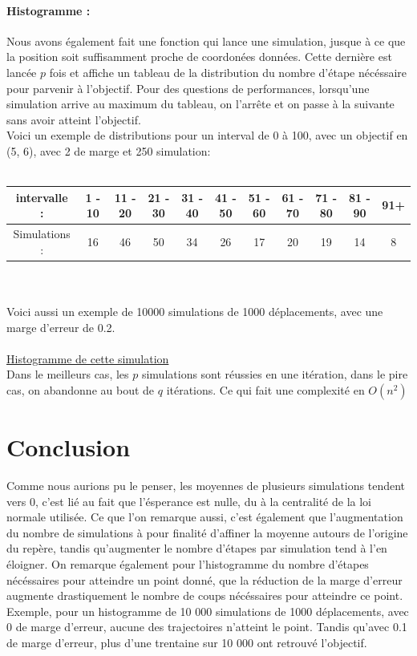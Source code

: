 \documentclass[10pt,a4paper]{article}
\begin{document}
\paragraph{Histogramme : }

Nous avons également fait une fonction qui lance une simulation, jusque à ce que la position soit suffisamment 
proche de coordonées données. 
Cette dernière est lancée $p$ fois et affiche un tableau de la distribution du nombre d'étape nécéssaire pour parvenir
à l'objectif.
Pour des questions de performances, lorsqu'une simulation arrive au maximum du tableau,
on l'arrête et on passe à la suivante sans avoir atteint l'objectif.
\\
Voici un exemple de distributions pour un interval de 0 à 100, avec un objectif en (5, 6), avec 2 de marge et 250 simulation: \\\\
\begin{tabular}{| c | c |c | c | c | c | c | c | c | c | c |}
    \hline
    intervalle : & 1 - 10 & 11 - 20 & 21 - 30 & 31 - 40 & 41 - 50 & 51 - 60 & 61 - 70 & 71 - 80 & 81 - 90 & 91+\\
    \hline
    Simulations : & 16 & 46 & 50 & 34 & 26 & 17 & 20 & 19 & 14 & 8\\
    \hline
\end{tabular}
\\\\
Voici aussi un exemple de 10000 simulations de 1000 déplacements, avec une marge d'erreur de 0.2.
\\\\
\hyperref[figure5]{Histogramme de cette simulation}
\\  

Dans le meilleurs cas, les $p$ simulations sont réussies en une itération, dans le pire cas, on abandonne au bout de $q$ itérations.
Ce qui fait une complexité en $O(n^{2})$

\section{Conclusion}

Comme nous aurions pu le penser, les moyennes de plusieurs simulations tendent vers 0, c'est lié au fait que l'ésperance est nulle,
du à la centralité de la loi normale utilisée. Ce que l'on remarque aussi, c'est également que l'augmentation du nombre de simulations à 
pour finalité d'affiner la moyenne autours de l'origine du repère, tandis qu'augmenter le nombre d'étapes par simulation tend à l'en éloigner.
\newline
On remarque également pour l'histogramme du nombre d'étapes nécéssaires pour atteindre un point donné, que la réduction de la marge d'erreur 
augmente drastiquement le nombre de coups nécéssaires pour atteindre ce point. 
Exemple, pour un histogramme de 10 000 simulations de 1000 déplacements, avec 0 de marge d'erreur, aucune des trajectoires n'atteint le point. 
Tandis qu'avec 0.1 de marge d'erreur, plus d'une trentaine sur 10 000 ont retrouvé l'objectif.
\end{document}
